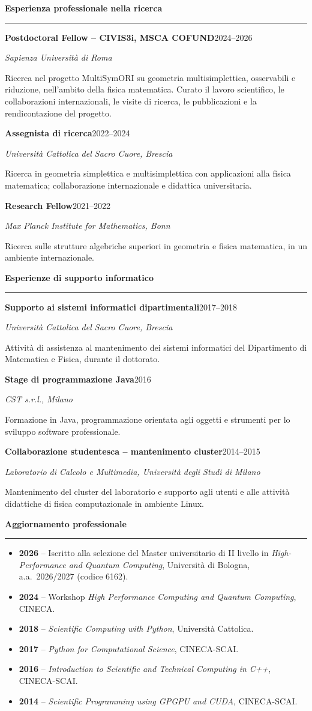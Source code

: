 \documentclass[10pt,a4paper]{article}
\newcommand{\cvsection}[1]{%
    \Needspace{4\baselineskip}%
    \vspace{0.8em}%
    {\large\bfseries\color{accent} #1}\par
    \vspace{0.2em}\hrule\vspace{0.45em}%
}
\newcommand{\entry}[4]{%
    \Needspace{4\baselineskip}%
    \textbf{#1}\hfill #2\par
    \textit{#3}\par
    #4\par\vspace{0.45em}%
}
\begin{document}
\newpage
\cvsection{Esperienza professionale nella ricerca}
\entry{Postdoctoral Fellow -- CIVIS3i, MSCA COFUND}{2024--2026}{Sapienza Università di Roma}{%
Ricerca nel progetto MultiSymORI su geometria multisimplettica, osservabili e riduzione, nell'ambito della fisica matematica.
Curato il lavoro scientifico, le collaborazioni internazionali, le visite di ricerca, le pubblicazioni e la rendicontazione del progetto.
}
\entry{Assegnista di ricerca}{2022--2024}{Università Cattolica del Sacro Cuore, Brescia}{%
Ricerca in geometria simplettica e multisimplettica con applicazioni alla fisica matematica; collaborazione internazionale e didattica universitaria.}
\entry{Research Fellow}{2021--2022}{Max Planck Institute for Mathematics, Bonn}{%
Ricerca sulle strutture algebriche superiori in geometria e fisica matematica, in un ambiente internazionale.}

\cvsection{Esperienze di supporto informatico}
\entry{Supporto ai sistemi informatici dipartimentali}{2017--2018}{Università Cattolica del Sacro Cuore, Brescia}{%
Attività di assistenza al mantenimento dei sistemi informatici del Dipartimento di Matematica e Fisica, durante il dottorato.}
\entry{Stage di programmazione Java}{2016}{CST s.r.l., Milano}{%
Formazione in Java, programmazione orientata agli oggetti e strumenti per lo sviluppo software professionale.}
\entry{Collaborazione studentesca -- mantenimento cluster}{2014--2015}{Laboratorio di Calcolo e Multimedia, Università degli Studi di Milano}{%
Mantenimento del cluster del laboratorio e supporto agli utenti e alle attività didattiche di fisica computazionale in ambiente Linux.}

\cvsection{Aggiornamento professionale}
\begin{itemize}
    \item \textbf{2026} -- Iscritto alla selezione del Master universitario di II livello in \emph{High-Performance and Quantum Computing}, Università di Bologna, a.a.\ 2026/2027 (codice 6162).
    \item \textbf{2024} -- Workshop \emph{High Performance Computing and Quantum Computing}, CINECA.
    \item \textbf{2018} -- \emph{Scientific Computing with Python}, Università Cattolica.
    \item \textbf{2017} -- \emph{Python for Computational Science}, CINECA-SCAI.
    \item \textbf{2016} -- \emph{Introduction to Scientific and Technical Computing in C++}, CINECA-SCAI.
    \item \textbf{2014} -- \emph{Scientific Programming using GPGPU and CUDA}, CINECA-SCAI.
\end{itemize}
\end{document}
